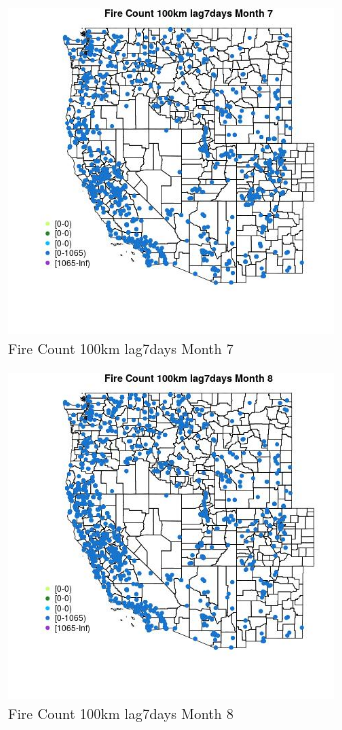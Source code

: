 \begin{figure} 
\centering  
\includegraphics[width=0.77\textwidth]{Code_Outputs/Report_ML_input_PM25_Step4_part_f_de_duplicated_aveswNAs_MapObsMo7Fire_Count_100km_lag7days.jpg} 
\caption{\label{fig:Report_ML_input_PM25_Step4_part_f_de_duplicated_aveswNAsMapObsMo7Fire_Count_100km_lag7days}Fire Count 100km lag7days Month 7} 
\end{figure} 
 

\clearpage 

\begin{figure} 
\centering  
\includegraphics[width=0.77\textwidth]{Code_Outputs/Report_ML_input_PM25_Step4_part_f_de_duplicated_aveswNAs_MapObsMo8Fire_Count_100km_lag7days.jpg} 
\caption{\label{fig:Report_ML_input_PM25_Step4_part_f_de_duplicated_aveswNAsMapObsMo8Fire_Count_100km_lag7days}Fire Count 100km lag7days Month 8} 
\end{figure} 
 

